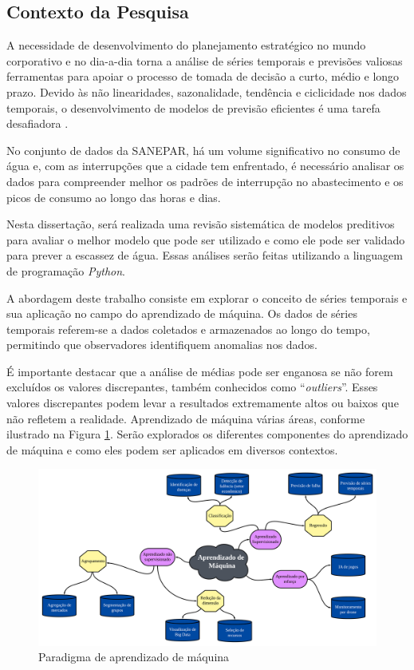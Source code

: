 \subsection{Contexto da Pesquisa} \label{subsec:contexto}
A necessidade de desenvolvimento do planejamento estratégico no mundo corporativo e no dia-a-dia torna a análise de séries temporais e previsões valiosas ferramentas para apoiar o processo de tomada de decisão a curto, médio e longo prazo. Devido às não linearidades, sazonalidade, tendência e ciclicidade nos dados temporais, o desenvolvimento de modelos de previsão eficientes é uma tarefa desafiadora \cite{mateus}.

No conjunto de dados da SANEPAR, há um volume significativo no consumo de água e, com as interrupções que a cidade tem enfrentado, é necessário analisar os dados para compreender melhor os padrões de interrupção no abastecimento e os picos de consumo ao longo das horas e dias.

Nesta dissertação, será realizada uma revisão sistemática de modelos preditivos para avaliar o melhor modelo que pode ser utilizado e como ele pode ser validado para prever a escassez de água. Essas análises serão feitas utilizando a linguagem de programação \textit{Python}.

A abordagem deste trabalho consiste em explorar o conceito de séries temporais e sua aplicação no campo do aprendizado de máquina. Os dados de séries temporais referem-se a dados coletados e armazenados ao longo do tempo, permitindo que observadores identifiquem anomalias nos dados.

É importante destacar que a análise de médias pode ser enganosa se não forem excluídos os valores discrepantes, também conhecidos como ``\textit{outliers}''. Esses valores discrepantes podem levar a resultados extremamente altos ou baixos que não refletem a realidade.
Aprendizado de máquina várias áreas, conforme ilustrado na Figura \ref{fig:paradigma-ml}. Serão explorados os diferentes componentes do aprendizado de máquina e como eles podem ser aplicados em diversos contextos.
 
\begin{figure}[!hb]
	\centering
	\caption{Paradigma de aprendizado de máquina}
	\includegraphics[width=1\linewidth]{Introducao/Figuras/paradigma-ml}
	
	\label{fig:paradigma-ml}
\end{figure}
  
